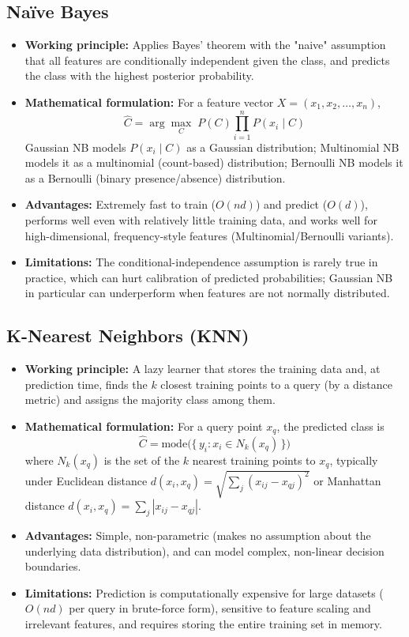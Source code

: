 \documentclass[12pt,a4paper]{article}
\begin{document}
\subsection*{Na\"ive Bayes}
\begin{itemize}
\item \textbf{Working principle:} Applies Bayes' theorem with the "naive" assumption
that all features are conditionally independent given the class, and predicts the class
with the highest posterior probability.
\item \textbf{Mathematical formulation:} For a feature vector
$X = (x_1, x_2, \dots, x_n)$,
\begin{equation}
\hat{C} = \arg\max_{C} \; P(C) \prod_{i=1}^{n} P(x_i \mid C)
\end{equation}
Gaussian NB models $P(x_i \mid C)$ as a Gaussian distribution; Multinomial NB models
it as a multinomial (count-based) distribution; Bernoulli NB models it as a Bernoulli
(binary presence/absence) distribution.
\item \textbf{Advantages:} Extremely fast to train ($O(nd)$) and predict ($O(d)$),
performs well even with relatively little training data, and works well for
high-dimensional, frequency-style features (Multinomial/Bernoulli variants).
\item \textbf{Limitations:} The conditional-independence assumption is rarely true in
practice, which can hurt calibration of predicted probabilities; Gaussian NB in
particular can underperform when features are not normally distributed.
\end{itemize}

\subsection*{K-Nearest Neighbors (KNN)}
\begin{itemize}
\item \textbf{Working principle:} A lazy learner that stores the training data and, at
prediction time, finds the $k$ closest training points to a query (by a distance
metric) and assigns the majority class among them.
\item \textbf{Mathematical formulation:} For a query point $x_q$, the predicted class is
\begin{equation}
\hat{C} = \mathrm{mode}\big(\{\, y_i : x_i \in N_k(x_q) \,\}\big)
\end{equation}
where $N_k(x_q)$ is the set of the $k$ nearest training points to $x_q$, typically under
Euclidean distance $d(x_i, x_q) = \sqrt{\sum_j (x_{ij} - x_{qj})^2}$ or Manhattan
distance $d(x_i, x_q) = \sum_j |x_{ij} - x_{qj}|$.
\item \textbf{Advantages:} Simple, non-parametric (makes no assumption about the
underlying data distribution), and can model complex, non-linear decision boundaries.
\item \textbf{Limitations:} Prediction is computationally expensive for large datasets
($O(nd)$ per query in brute-force form), sensitive to feature scaling and irrelevant
features, and requires storing the entire training set in memory.
\end{itemize}
\end{document}
